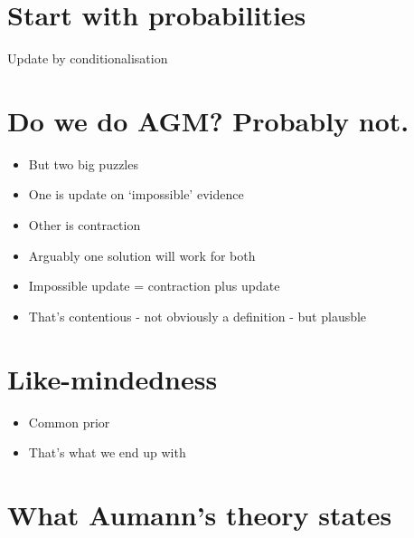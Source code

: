 
\def\mytitle{Feb 15}
\def\myauthor{Brian Weatherson}
\def\mydate{February 15, 2018}


\section{Start with probabilities}
\label{startwithprobabilities}

Update by conditionalisation

\section{Do we do AGM? Probably not.}
\label{dowedoagmprobablynot.}

\begin{itemize}
\item{} But two big puzzles

\item{} One is update on `impossible' evidence

\item{} Other is contraction

\item{} Arguably one solution will work for both

\item{} Impossible update = contraction plus update

\item{} That's contentious - not obviously a definition - but plausble

\end{itemize}

\section{Like-mindedness}
\label{like-mindedness}

\begin{itemize}
\item{} Common prior

\item{} That's what we end up with

\end{itemize}

\section{What Aumann's theory states}
\label{whataumannstheorystates}

